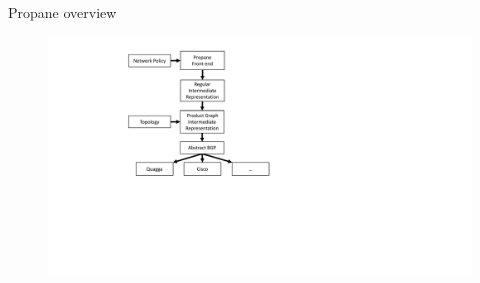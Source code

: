 \begin{frame}{Propane overview}
    \begin{figure}
        \includegraphics[height=\textheight,keepaspectratio,clip,trim={5cm 5cm 15cm 1cm}]{figures/pipeline.pdf}
    \end{figure}
\end{frame}

